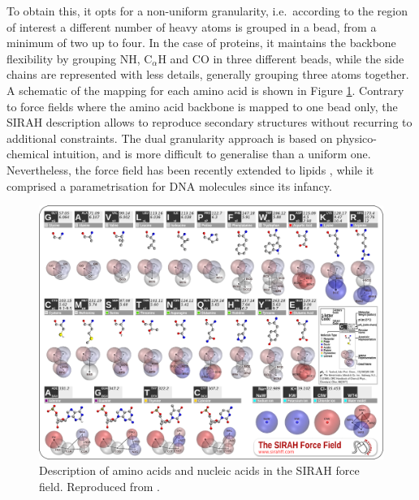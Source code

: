 To obtain this, it opts for a non-uniform granularity, i.e.\ according to the region of interest a different number of heavy atoms is grouped in a bead, from a minimum of two up to four. In the case of proteins, it maintains the backbone flexibility by grouping NH, C$_\alpha$H and CO in three different beads, while the side chains are represented with less details, generally grouping three atoms together. A schematic of the mapping for each amino acid is shown in Figure \ref{fig:sirah}. Contrary to force fields where the amino acid backbone is mapped to one bead only, the SIRAH description allows to reproduce secondary structures without recurring to additional constraints.
%
The dual granularity approach is based on physico-chemical intuition, and is more difficult to generalise than a uniform one. Nevertheless, the force field has been recently extended to lipids \cite{Barrera2019}, while it comprised a parametrisation for DNA molecules since its infancy.
%
\begin{figure}[h!]
\centering
\includegraphics[width=0.8\linewidth]{2methods/pics/sirah_aa.png}
%
\caption[SIRAH force field amino acid and DNA description]{Description of amino acids and nucleic acids in the SIRAH force field. Reproduced from \cite{sirah_web}.}
\label{fig:sirah}
\end{figure}

